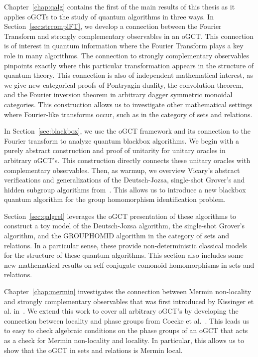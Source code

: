 Chapter~\ref{chap:qalg} contains the first of the main results of this thesis as it applies oGCTs to the study of quantum algorithms in three ways.  In Section~\ref{sec:strcomplFT}, we develop a connection between the Fourier Transform and strongly complementary observables in an oGCT.  This connection is of interest in quantum information where the Fourier Transform plays a key role in many algorithms.  The connection to strongly complementary observables pinpoints exactly where this particular transformation appears in the structure of quantum theory.  This connection is also of independent mathematical interest, as we give new categorical proofs of Pontryagin duality, the convolution theorem, and the Fourier inversion theorem in arbitrary dagger symmetric monoidal categories. This construction allows us to investigate other mathematical settings where Fourier-like transforms occur, such as in the category of sets and relations.

In Section~\ref{sec:blackbox}, we use the oGCT framework and its connection to the Fourier transform to analyze quantum blackbox algorithms.  We begin with a purely abstract construction and proof of unitarity for unitary oracles in arbitrary oGCT's. This construction directly connects these unitary oracles with complementary observables. Then, as warmup, we overview Vicary's abstract verifications and generalizations  of the Deutsch-Jozsa, single-shot Grover's and hidden subgroup algorithms from~\cite{vicary-tqa}.  This allows us to introduce a new blackbox quantum algorithm for the group homomorphism identification problem. 

Section~\ref{sec:qalgrel} leverages the oGCT presentation of these algorithms to construct a toy model of the Deutsch-Jozsa algorithm, the single-shot Grover's algorithm, and the GROUPHOMID algorithm in the category of sets and relations. In a particular sense, these provide non-deterministic classical models for the structure of these quantum algorithms. This section also includes some new mathematical results on self-conjugate comonoid homomorphisms in sets and relations.

Chapter~\ref{chap:mermin} investigates the connection between Mermin non-locality and strongly complementary observables that was first introduced by Kissinger et al. in~\cite{coecke2012strong}. We extend this work to cover all arbitrary oGCT's by developing the connection between locality and phase groups from Coecke et al.~\cite{coecke2011phase}. This leads us to easy to check algebraic conditions on the phase groups of an oGCT that acts as a check for Mermin non-locality and locality. In particular, this allows us to show that the oGCT in sets and relations is Mermin local.

